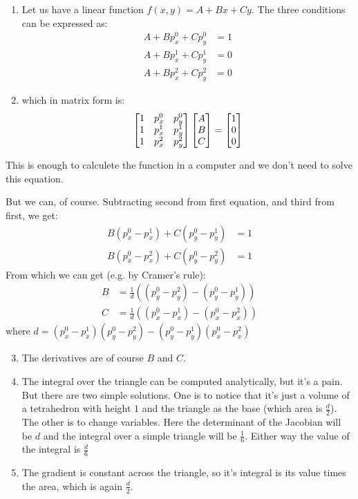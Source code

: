 \documentclass[12pt,class=article,crop=false,preview=false]{standalone}
\begin{document}
\begin{solution}
\begin{enumerate}[label=\alph*)]
\item Let us have a linear function $f(x,y) = A+Bx+Cy$. The three conditions can be expressed as:
\begin{align*}
    A+Bp^0_x+Cp^0_y &= 1\\
    A+Bp^1_x+Cp^1_y &= 0\\
    A+Bp^2_x+Cp^2_y &= 0
\end{align*}
\item which in matrix form is:
\[\left[\begin{matrix}
1 & p^0_x & p^0_y\\
1 & p^1_x & p^1_y\\
1 & p^2_x & p^2_y
\end{matrix}\right]\left[\begin{matrix}A\\B\\C\end{matrix}\right] = \left[\begin{matrix}1\\0\\0\end{matrix}\right]\]
\end{enumerate}

This is enough to calculete the function in a computer and we don't need to solve this equation.

But we can, of course. Subtracting second from first equation, and third from first, we get:
\begin{align*}
    B(p^0_x-p^1_x)+C(p^0_y-p^1_y) &= 1\\
    B(p^0_x-p^2_x)+C(p^0_y-p^2_y) &= 1
\end{align*}
From which we can get (e.g. by Cramer's rule):
\begin{align*}
    B &= \frac{1}{d}((p^0_y-p^2_y) - (p^0_y-p^1_y))\\
    C &= \frac{1}{d}((p^0_x-p^1_x) - (p^0_x-p^2_x))
\end{align*}
where $d = (p^0_x-p^1_x)(p^0_y-p^2_y) - (p^0_y-p^1_y)(p^0_x-p^2_x)$

\begin{enumerate}[label=\alph*)]\setcounter{enumi}{2}
    \item The derivatives are of course $B$ and $C$.
    \item The integral over the triangle can be computed analytically, but it's a pain. But there are two simple solutions. One is to notice that it's just a volume of a tetrahedron with height $1$ and the triangle as the base (which area is $\frac{d}{2}$). The other is to change variables. Here the determinant of the Jacobian will be $d$ and the integral over a simple triangle will be $\frac{1}{6}$. Either way the value of the integral is $\frac{d}{6}$
    \item The gradient is constant across the triangle, so it's integral is its value times the area, which is again $\frac{d}{2}$.
\end{enumerate}
\end{solution}
\end{document}
